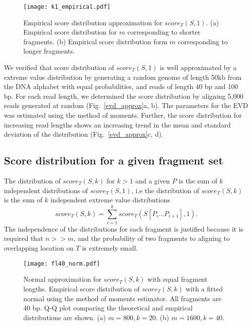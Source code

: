 \begin{figure}[t!]
\centering
\texttt{[image: k1\_empirical.pdf]}
\caption[Empirical score distribution for $score_T(S,1)$]{
  Empirical score distribution approximation for $score_T(S,1)$.
  (a) Empirical score distribution for $m$ corresponding to shorter
  fragments.
  (b) Empirical score distribution form $m$ corresponding to longer
  fragments.}
\label{evd_empirical}
\end{figure}

We verified that score distribution of $score_T(S,1)$ is well
approximated by a extreme value distribution by generating a random
genome of length 50kb from the DNA alphabet with equal probabilities,
and reads of length 40 bp and 100 bp. For each read length, we
determined the score distribution by aligning 5,000 reads generated at
random (Fig.~\ref{evd_approx}a, b). The parameters for the EVD was
estimated using the method of moments.
Further, the score distribution for increasing read lengths shows an
increasing trend in the mean and standard deviation of the distribution
(Fig.~\ref{evd_approx}c, d).


\subsection{Score distribution for a given fragment set}
The distribution of $score_T(S,k)$ for $k > 1$ and a given $P$ is the
sum of $k$ independent distributions of $score_T(S,1)$, i.e the
distribution of $score_T(S,k)$ is the sum of $k$ independent extreme
value distributions \[score_T(S,k) = \sum_{i=1}^{k} score_T(S[P_i \dots
P_{i+1}], 1).\]
The independence of the distributions for each fragment is justified
because it is required that $n >> m$, and the probability of two
fragments to aligning to overlapping location on $T$ is extremely small.

\begin{figure}[t!]
\centering
\texttt{[image: fl40\_norm.pdf]}
\caption[Normal approximation for $score_T(S,k)$ with equal fragment
  lengths]{
  Normal approximation for $score_T(S,k)$ with equal fragment lengths.
  Empirical score distribution of $score_T(S,k)$ with a fitted
  normal using the method of moments estimator. All fragments are 40 bp.
  Q-Q plot comparing the theoretical and empirical distributions are shown.
  (a) $m=800, k=20$.
  (b) $m=1600, k=40$.}
\label{norm_const}
\end{figure}

